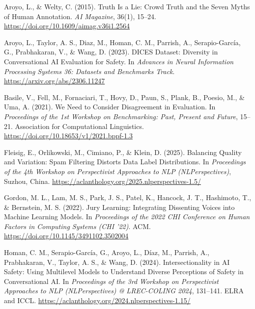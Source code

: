 \begin{description}[leftmargin=1.6em,style=unboxed,itemsep=0.3em]

\item Aroyo, L., \& Welty, C. (2015). Truth Is a Lie: Crowd Truth and the Seven Myths of Human
Annotation. \emph{AI Magazine}, 36(1), 15--24.
\url{https://doi.org/10.1609/aimag.v36i1.2564}

\item Aroyo, L., Taylor, A. S., Diaz, M., Homan, C. M., Parrish, A., Serapio-Garc\'{i}a, G.,
Prabhakaran, V., \& Wang, D. (2023). DICES Dataset: Diversity in Conversational AI Evaluation for
Safety. In \emph{Advances in Neural Information Processing Systems 36: Datasets and Benchmarks
Track}. \url{https://arxiv.org/abs/2306.11247}

\item Basile, V., Fell, M., Fornaciari, T., Hovy, D., Paun, S., Plank, B., Poesio, M., \& Uma, A.
(2021). We Need to Consider Disagreement in Evaluation. In \emph{Proceedings of the 1st Workshop
on Benchmarking: Past, Present and Future}, 15--21. Association for Computational Linguistics.
\url{https://doi.org/10.18653/v1/2021.bppf-1.3}

\item Fleisig, E., Orlikowski, M., Cimiano, P., \& Klein, D. (2025). Balancing Quality and
Variation: Spam Filtering Distorts Data Label Distributions. In \emph{Proceedings of the 4th
Workshop on Perspectivist Approaches to NLP (NLPerspectives)}, Suzhou, China.
\url{https://aclanthology.org/2025.nlperspectives-1.5/}

\item Gordon, M. L., Lam, M. S., Park, J. S., Patel, K., Hancock, J. T., Hashimoto, T., \&
Bernstein, M. S. (2022). Jury Learning: Integrating Dissenting Voices into Machine Learning
Models. In \emph{Proceedings of the 2022 CHI Conference on Human Factors in Computing Systems
(CHI '22)}. ACM. \url{https://doi.org/10.1145/3491102.3502004}

\item Homan, C. M., Serapio-Garc\'{i}a, G., Aroyo, L., D\'{i}az, M., Parrish, A., Prabhakaran, V.,
Taylor, A. S., \& Wang, D. (2024). Intersectionality in AI Safety: Using Multilevel Models to
Understand Diverse Perceptions of Safety in Conversational AI. In \emph{Proceedings of the 3rd
Workshop on Perspectivist Approaches to NLP (NLPerspectives) @ LREC-COLING 2024}, 131--141. ELRA
and ICCL. \url{https://aclanthology.org/2024.nlperspectives-1.15/}


\end{description}
